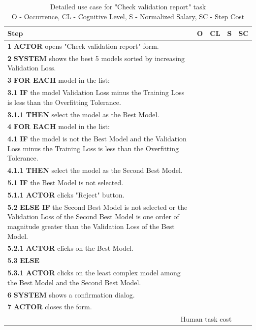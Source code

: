 \begin{table}[H]
\centering
\begin{tabularx}{\textwidth}{|X|c|c|c|c|}
\hline
\textbf{Step} & \textbf{O} & \textbf{CL} & \textbf{S} & \textbf{SC} \\
\hline
\textbf{1} \textbf{ACTOR} opens "Check validation report" form. & & & & \\
\hline
\textbf{2} \textbf{SYSTEM} shows the best 5 models sorted by increasing Validation Loss. & & & & \\
\hline
\textbf{3} \textbf{FOR EACH} model in the list: & & & & \\
\hline
\textbf{3.1} \textbf{IF} the model Validation Loss minus the Training Loss is less than the Overfitting Tolerance. & & & & \\
\hline
\textbf{3.1.1} \textbf{THEN} select the model as the Best Model. & & & & \\
\hline
\textbf{4} \textbf{FOR EACH} model in the list: & & & & \\
\hline
\textbf{4.1} \textbf{IF} the model is not the Best Model and the Validation Loss minus the Training Loss is less than the Overfitting Tolerance. & & & & \\
\hline
\textbf{4.1.1} \textbf{THEN} select the model as the Second Best Model. & & & & \\
\hline
\textbf{5.1} \textbf{IF} the Best Model is not selected. & & & & \\
\hline
\textbf{5.1.1} \textbf{ACTOR} clicks "Reject" button. & & & & \\
\hline
\textbf{5.2} \textbf{ELSE IF} the Second Best Model is not selected or the Validation Loss of the Second Best Model is one order of magnitude greater than the Validation Loss of the Best Model. & & & & \\
\hline
\textbf{5.2.1} \textbf{ACTOR} clicks on the Best Model. & & & & \\
\hline
\textbf{5.3} \textbf{ELSE} & & & & \\
\hline
\textbf{5.3.1} \textbf{ACTOR} clicks on the least complex model among the Best Model and the Second Best Model. & & & & \\
\hline
\textbf{6} \textbf{SYSTEM} shows a confirmation dialog. & & & & \\
\hline
\textbf{7} \textbf{ACTOR} closes the form. & & & & \\
\hline
\multicolumn{4}{|r|}{Human task cost} & \\
\hline
\end{tabularx}
\caption{Detailed use case for "Check validation report" task\\ 
O - Occurrence, CL - Cognitive Level, S - Normalized Salary, SC - Step Cost}
\label{table:check_validation_report}
\end{table}

